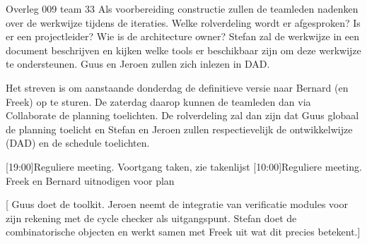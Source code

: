 \documentclass{article}
\begin{document}
\begin{Minutes}{Overleg 009 team 33}
Als voorbereiding constructie zullen de teamleden nadenken over de werkwijze tijdens
de iteraties. Welke rolverdeling wordt er afgesproken? Is er een projectleider?
Wie is de architecture owner? Stefan zal de werkwijze in een document beschrijven en
kijken welke tools er beschikbaar zijn om deze werkwijze te ondersteunen. Guus en
Jeroen zullen zich inlezen in DAD.


Het streven is om aanstaande donderdag de definitieve versie naar Bernard (en Freek)
op te sturen. De zaterdag daarop kunnen de teamleden dan via Collaborate de planning
toelichten. De rolverdeling zal dan zijn dat Guus globaal de planning toelicht en
Stefan en Jeroen zullen respectievelijk de ontwikkelwijze (DAD) en de schedule toelichten.


[19:00]{Reguliere meeting. Voortgang taken, zie takenlijst}
[10:00]{Reguliere meeting. Freek en Bernard uitnodigen voor plan}





[
Guus doet de toolkit. Jeroen neemt de integratie van verificatie modules
voor zijn rekening met de cycle checker als uitgangspunt. Stefan doet
de combinatorische objecten en werkt samen met Freek uit wat dit precies betekent.]


\end{Minutes}
\end{document}
